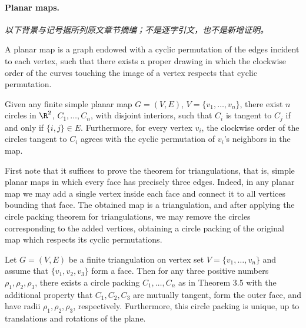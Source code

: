 \paragraph{Planar maps.}
\noindent\textit{以下背景与记号据所列原文章节摘编；不是逐字引文，也不是新增证明。}\par
A planar map is a graph endowed with a cyclic permutation of the edges incident to each vertex, such that there exists a proper drawing in which the clockwise order of the curves touching the image of a vertex respects that cyclic permutation.

\begin{theorem}
Given any finite simple planar map $G=(V,E)$, $V=\{v_1,\ldots,v_n\}$, there exist $n$ circles in $\R^2$, $C_1,\ldots,C_n$, with disjoint interiors, such that $C_i$ is tangent to $C_j$ if and only if $\{i,j\}\in E$. Furthermore, for every vertex $v_i$, the clockwise order of the circles tangent to $C_i$ agrees with the cyclic permutation of $v_i$'s neighbors in the map.
\end{theorem}
First note that it suffices to prove the theorem for triangulations, that is, simple planar maps in which every face has precisely three edges. Indeed, in any planar map we may add a single vertex inside each face and connect it to all vertices bounding that face. The obtained map is a triangulation, and after applying the circle packing theorem for triangulations, we may remove the circles corresponding to the added vertices, obtaining a circle packing of the original map which respects its cyclic permutations.

\begin{theorem}[3.6]
Let $G=(V,E)$ be a finite triangulation on vertex set $V=\{v_1,\ldots,v_n\}$ and assume that $\{v_1,v_2,v_3\}$ form a face. Then for any three positive numbers $\rho_1,\rho_2,\rho_3$, there exists a circle packing $C_1,\ldots,C_n$ as in Theorem 3.5 with the additional property that $C_1,C_2,C_3$ are mutually tangent, form the outer face, and have radii $\rho_1,\rho_2,\rho_3$, respectively. Furthermore, this circle packing is unique, up to translations and rotations of the plane.
\end{theorem}
